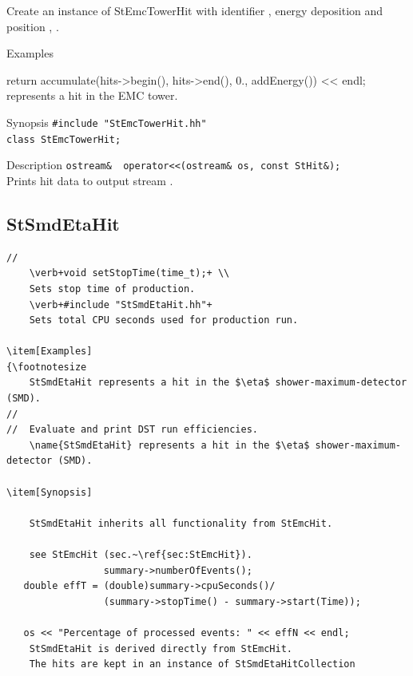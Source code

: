 \begin{Entry}
    Create an instance of StEmcTowerHit with identifier ,
    energy deposition  and position , .
%
    
\item[Examples]  
\label{sec:StEmcTowerHit}
\begin{Entry}
   return accumulate(hits->begin(), hits->end(), 0., addEnergy()) << endl;
     represents a hit in the EMC tower.

\item[Synopsis]
    \verb+#include "StEmcTowerHit.hh"+\\
    \verb+class StEmcTowerHit;+\\

\item[Description]
    \verb+ostream&  operator<<(ostream& os, const StHit&);+\\
    Prints hit data to output stream .

\subsection{StSmdEtaHit } 
{\footnotesize
\begin{verbatim}
//
    \verb+void setStopTime(time_t);+ \\
    Sets stop time of production.
    \verb+#include "StSmdEtaHit.hh"+
    Sets total CPU seconds used for production run.

\item[Examples]
{\footnotesize
    StSmdEtaHit represents a hit in the $\eta$ shower-maximum-detector (SMD).
//
//  Evaluate and print DST run efficiencies.
    \name{StSmdEtaHit} represents a hit in the $\eta$ shower-maximum-detector (SMD).
    
\item[Synopsis] 

    StSmdEtaHit inherits all functionality from StEmcHit.
    
    see StEmcHit (sec.~\ref{sec:StEmcHit}).
                 summary->numberOfEvents();
   double effT = (double)summary->cpuSeconds()/
                 (summary->stopTime() - summary->start(Time));
    
   os << "Percentage of processed events: " << effN << endl;
    StSmdEtaHit is derived directly from StEmcHit.
    The hits are kept in an instance of StSmdEtaHitCollection
\end{verbatim}
}%


\end{Entry}
\end{Entry}
